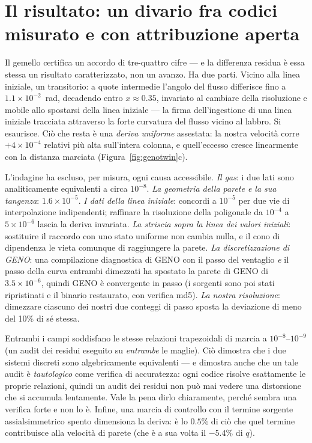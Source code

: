 \section{Il risultato: un divario fra codici misurato e con
attribuzione aperta}
\label{sec:twingap}

Il gemello certifica un accordo di tre-quattro cifre --- e la
differenza residua è essa stessa un risultato caratterizzato, non un
avanzo. Ha due parti. Vicino alla linea iniziale, un transitorio: a
quote intermedie l'angolo del flusso differisce fino a
$1.1\times10^{-2}$~rad, decadendo entro $x \approx 0.35$, invariato
al cambiare della risoluzione e mobile allo spostarsi della linea
iniziale --- la firma dell'ingestione di una linea iniziale
tracciata attraverso la forte curvatura del flusso vicino al labbro.
Si esaurisce. Ciò che resta è una \emph{deriva uniforme} assestata:
la nostra velocità corre $+4\times10^{-4}$ relativi più alta
sull'intera colonna, e quell'eccesso cresce linearmente con la
distanza marciata (Figura~\ref{fig:genotwin}c).

L'indagine ha escluso, per misura, ogni causa accessibile.
\emph{Il gas}: i due lati sono analiticamente equivalenti a circa
$10^{-8}$. \emph{La geometria della parete e la sua tangenza}:
$1.6\times10^{-5}$. \emph{I dati della linea iniziale}: concordi a
$10^{-5}$ per due vie di interpolazione indipendenti; raffinare la
risoluzione della poligonale da $10^{-4}$ a $5\times10^{-6}$ lascia
la deriva invariata. \emph{La striscia sopra la linea dei valori
iniziali}: sostituire il raccordo con uno stato uniforme non cambia
nulla, e il cono di dipendenza le vieta comunque di raggiungere la
parete. \emph{La discretizzazione di GENO}: una compilazione
diagnostica di GENO con il passo del ventaglio \emph{e} il passo
della curva entrambi dimezzati ha spostato la parete di GENO di
$3.5\times10^{-6}$, quindi GENO è convergente in passo (i sorgenti
sono poi stati ripristinati e il binario restaurato, con verifica
md5). \emph{La nostra risoluzione}: dimezzare ciascuno dei nostri due
conteggi di passo sposta la deviazione di meno del 10\% di sé
stessa.

Entrambi i campi soddisfano le stesse relazioni trapezoidali di
marcia a $10^{-8}$--$10^{-9}$ (un audit dei residui eseguito su
\emph{entrambe} le maglie). Ciò dimostra che i due sistemi discreti
sono algebricamente equivalenti --- e dimostra anche che un tale
audit è \emph{tautologico} come verifica di accuratezza: ogni codice
risolve esattamente le proprie relazioni, quindi un audit dei residui
non può mai vedere una distorsione che si accumula lentamente. Vale
la pena dirlo chiaramente, perché sembra una verifica forte e non lo
è. Infine, una marcia di controllo con il termine sorgente
assialsimmetrico spento dimensiona la deriva: è lo $0.5\%$ di ciò che
quel termine contribuisce alla velocità di parete (che è a sua volta
il $-5.4\%$ di $q$).

